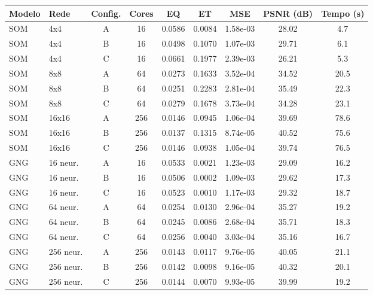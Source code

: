 \begin{tabular}{llccccccc}
\toprule
Modelo & Rede & Config. & Cores & EQ & ET & MSE & PSNR (dB) & Tempo (s)\\
\midrule
SOM & 4x4 & A & 16 & 0.0586 & 0.0084 & 1.58e-03 & 28.02 & 4.7\\
SOM & 4x4 & B & 16 & 0.0498 & 0.1070 & 1.07e-03 & 29.71 & 6.1\\
SOM & 4x4 & C & 16 & 0.0661 & 0.1977 & 2.39e-03 & 26.21 & 5.3\\
\midrule
SOM & 8x8 & A & 64 & 0.0273 & 0.1633 & 3.52e-04 & 34.52 & 20.5\\
SOM & 8x8 & B & 64 & 0.0251 & 0.2283 & 2.81e-04 & 35.49 & 22.3\\
SOM & 8x8 & C & 64 & 0.0279 & 0.1678 & 3.73e-04 & 34.28 & 23.1\\
\midrule
SOM & 16x16 & A & 256 & 0.0146 & 0.0945 & 1.06e-04 & 39.69 & 78.6\\
SOM & 16x16 & B & 256 & 0.0137 & 0.1315 & 8.74e-05 & 40.52 & 75.6\\
SOM & 16x16 & C & 256 & 0.0146 & 0.0938 & 1.05e-04 & 39.74 & 76.5\\
\midrule
GNG & 16 neur. & A & 16 & 0.0533 & 0.0021 & 1.23e-03 & 29.09 & 16.2\\
GNG & 16 neur. & B & 16 & 0.0506 & 0.0002 & 1.09e-03 & 29.62 & 17.3\\
GNG & 16 neur. & C & 16 & 0.0523 & 0.0010 & 1.17e-03 & 29.32 & 18.7\\
\midrule
GNG & 64 neur. & A & 64 & 0.0254 & 0.0130 & 2.96e-04 & 35.27 & 19.2\\
GNG & 64 neur. & B & 64 & 0.0245 & 0.0086 & 2.68e-04 & 35.71 & 18.3\\
GNG & 64 neur. & C & 64 & 0.0256 & 0.0040 & 3.03e-04 & 35.16 & 16.7\\
\midrule
GNG & 256 neur. & A & 256 & 0.0143 & 0.0117 & 9.76e-05 & 40.05 & 21.1\\
GNG & 256 neur. & B & 256 & 0.0142 & 0.0098 & 9.16e-05 & 40.32 & 20.1\\
GNG & 256 neur. & C & 256 & 0.0144 & 0.0070 & 9.93e-05 & 39.99 & 19.2\\
\bottomrule
\end{tabular}
